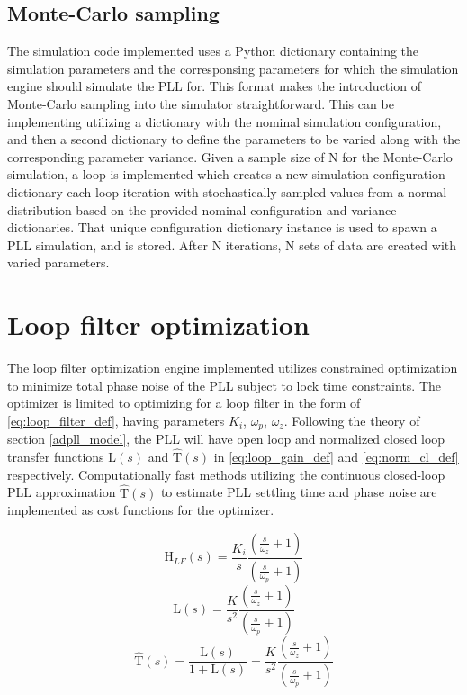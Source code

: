 \subsection{Monte-Carlo sampling}
The simulation code implemented uses a Python dictionary containing the simulation parameters and the corresponsing parameters for which the simulation engine should simulate the PLL for. This format makes the introduction of Monte-Carlo sampling into the simulator straightforward. This can be implementing utilizing a dictionary with the nominal simulation configuration, and then a second dictionary to define the parameters to be varied along with the corresponding parameter variance. Given a sample size of N for the Monte-Carlo simulation, a loop is implemented which creates a new simulation configuration dictionary each loop iteration with stochastically sampled values from a normal distribution based on the provided nominal configuration and variance dictionaries. That unique configuration dictionary instance is used to spawn a PLL simulation, and is stored. After N iterations, N sets of data are created with varied parameters.



\pagebreak
\section{Loop filter optimization}\label{methods_lf_opt}
The loop filter optimization engine implemented utilizes constrained optimization to minimize total phase noise of the PLL subject to lock time constraints. The optimizer is limited to optimizing for a loop filter in the form of \ref{eq:loop_filter_def}, having parameters $K_i$, $\omega_p$, $\omega_z$. Following the theory of section \ref{adpll_model}, the PLL will have open loop and normalized closed loop transfer functions $\mathrm{L}(s)$ and $\mathrm{\hat{T}}(s)$ in \ref{eq:loop_gain_def} and \ref{eq:norm_cl_def} respectively.  Computationally fast methods utilizing the continuous closed-loop PLL approximation $\mathrm{\hat{T}}(s)$ to estimate PLL settling time and phase noise are implemented as cost functions for the optimizer.

	\begin{equation}\label{eq:loop_filter_def}
	\mathrm{H}_{LF}(s) = \frac{K_i}{s}\frac{(\frac{s}{\omega_z}+1)}{(\frac{s}{\omega_p}+1)}
	\end{equation}
	\begin{equation}\label{eq:loop_gain_def}
	\mathrm{L}(s) = \frac{K}{s^2}\frac{(\frac{s}{\omega_z}+1)}{(\frac{s}{\omega_p}+1)}
	\end{equation}
	\begin{equation}\label{eq:norm_cl_def}
	\mathrm{\hat{T}}(s) = \frac{\mathrm{L}(s)}{1+\mathrm{L}(s)} = \frac{K}{s^2}\frac{(\frac{s}{\omega_z}+1)}{(\frac{s}{\omega_p}+1)}
	\end{equation}

